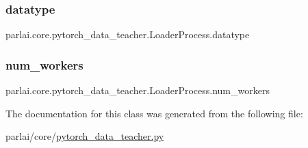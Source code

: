 \subsubsection{\texorpdfstring{datatype}{datatype}}
{\footnotesize\ttfamily parlai.\+core.\+pytorch\+\_\+data\+\_\+teacher.\+Loader\+Process.\+datatype}

\mbox{\label{classparlai_1_1core_1_1pytorch__data__teacher_1_1LoaderProcess_a7ee2a0402dcf126f894d7490e57ac48e}} 
\subsubsection{\texorpdfstring{num\+\_\+workers}{num\_workers}}
{\footnotesize\ttfamily parlai.\+core.\+pytorch\+\_\+data\+\_\+teacher.\+Loader\+Process.\+num\+\_\+workers}



The documentation for this class was generated from the following file\+:\begin{DoxyCompactItemize}
\item 
parlai/core/\hyperlink{pytorch__data__teacher_8py}{pytorch\+\_\+data\+\_\+teacher.\+py}\end{DoxyCompactItemize}

